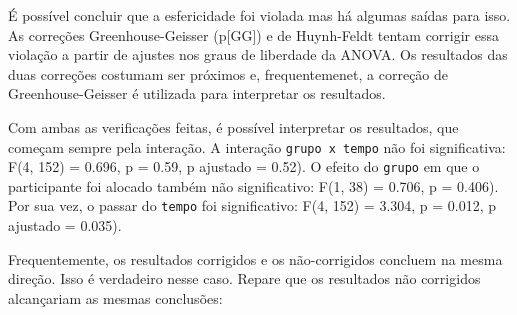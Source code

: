\documentclass[
]{book}
\newenvironment{Shaded}{\begin{snugshade}}{\end{snugshade}}
\newcommand{\KeywordTok}[1]{\textcolor[rgb]{0.13,0.29,0.53}{\textbf{#1}}}
\newcommand{\NormalTok}[1]{#1}
\newcommand{\OperatorTok}[1]{\textcolor[rgb]{0.81,0.36,0.00}{\textbf{#1}}}
\newcommand{\StringTok}[1]{\textcolor[rgb]{0.31,0.60,0.02}{#1}}
\begin{document}
É possível concluir que a esfericidade foi violada mas há algumas saídas para isso. As correções Greenhouse-Geisser (p{[}GG{]}) e de Huynh-Feldt tentam corrigir essa violação a partir de ajustes nos graus de liberdade da ANOVA. Os resultados das duas correções costumam ser próximos e, frequentemenet, a correção de Greenhouse-Geisser é utilizada para interpretar os resultados.

Com ambas as verificações feitas, é possível interpretar os resultados, que começam sempre pela interação. A interação \texttt{grupo\ x\ tempo} não foi significativa: F(4, 152) = 0.696, p = 0.59, p ajustado = 0.52). O efeito do \texttt{grupo} em que o participante foi alocado também não significativo: F(1, 38) = 0.706, p = 0.406). Por sua vez, o passar do \texttt{tempo} foi significativo: F(4, 152) = 3.304, p = 0.012, p ajustado = 0.035).

Frequentemente, os resultados corrigidos e os não-corrigidos concluem na mesma direção. Isso é verdadeiro nesse caso. Repare que os resultados não corrigidos alcançariam as mesmas conclusões:

\begin{Shaded}
\end{Shaded}
\end{document}
